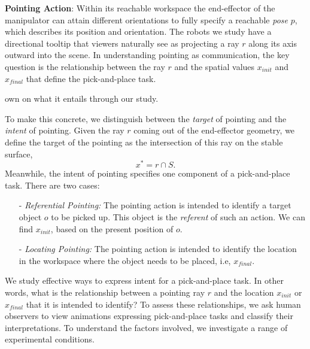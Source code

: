 \noindent\textbf{Pointing Action}: Within its reachable workspace the end-effector of the manipulator can attain different orientations to fully specify a reachable \textit{pose} $p$, which describes its position and orientation.  The robots we study have a directional tooltip that viewers naturally see as projecting a ray $r$ along its axis outward into the scene.  In understanding pointing as communication, the key question is the relationship between the ray $r$ and the spatial values $x_{init}$ and $x_{final}$ that define the pick-and-place task.

own on what it entails through our study.

To make this concrete, we distinguish between the \emph{target} of pointing and the \emph{intent} of pointing. Given the ray $r$ coming out of the end-effector geometry, we define the target of the pointing as the intersection of this ray on the stable surface, $$x^*= r\cap S.$$ Meanwhile, the intent of pointing specifies one component of a pick-and-place task.  There are two cases:
\begin{itemize}
    \item [-] \textit{Referential Pointing:} The pointing action is intended to identify a target object $o$ to be picked up. This object is the \textit{referent} of such an action. We can find $x_{init}$, based on the present position of $o$.
    \item [-] \textit{Locating Pointing:} The pointing action is intended to identify the location in the workspace where the object needs to be placed, i.e, $x_{final}$.
\end{itemize}


We study effective ways to express intent for a pick-and-place task. In other words, what is the relationship between a pointing ray $r$ and the location $x_{init}$ or $x_{final}$ that it is intended to identify?  To assess these relationships, we ask human observers to view animations expressing pick-and-place tasks and classify their interpretations.  To understand the factors involved, we investigate a range of experimental conditions.
